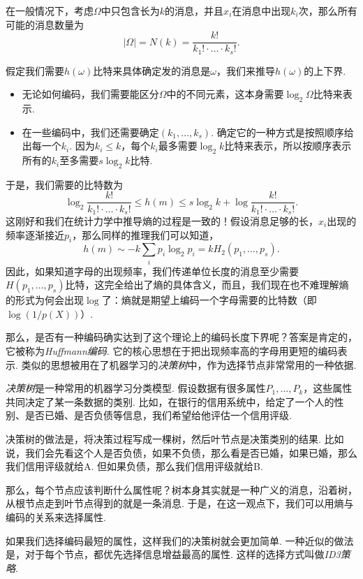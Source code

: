 在一般情况下，考虑$\Omega$中只包含长为$k$的消息，并且$x_i$在消息中出现$k_i$次，那么所有可能的消息数量为
\[|\Omega|=N(k)=\frac{k!}{k_1!\cdot\dots\cdot k_s!}.\]

假定我们需要$h(\omega)$比特来具体确定发的消息是$\omega$，我们来推导$h(\omega)$的上下界. 
\begin{itemize}
    \item 无论如何编码，我们需要能区分$\Omega$中的不同元素，这本身需要$\log_2\Omega$比特来表示. 
    \item 在一些编码中，我们还需要确定$(k_1,\dots,k_s)$. 确定它的一种方式是按照顺序给出每一个$k_i$. 因为$k_i\leq k$，每个$k_i$最多需要$\log_2 k$比特来表示，所以按顺序表示所有的$k_i$至多需要$s\log_2 k$比特.
\end{itemize}
于是，我们需要的比特数为
\[\log_2\frac{k!}{k_1!\cdot\dots\cdot k_s!}\leq h(m)\leq s\log_2k+\log\frac{k!}{k_1!\cdot\dots\cdot k_s!}.\]
这刚好和我们在统计力学中推导熵的过程是一致的！假设消息足够的长，$x_i$出现的频率逐渐接近$p_i$，那么同样的推理我们可以知道，
\[h(m)\sim -k\sum_i p_i\log_2 p_i=kH_2(p_1,\dots,p_s).\]
因此，如果知道字母的出现频率，我们传递单位长度的消息至少需要$H(p_1,\dots,p_s)$比特，这完全给出了熵的具体含义，而且，我们现在也不难理解熵的形式为何会出现$\log$了：熵就是期望上编码一个字母需要的比特数（即$\log(1/p(X))$）.

那么，是否有一种编码确实达到了这个理论上的编码长度下界呢？答案是肯定的，它被称为\textit{Huffmann编码}. 它的核心思想在于把出现频率高的字母用更短的编码表示. 类似的思想被用在了机器学习的\textit{决策树}中，作为选择节点非常常用的一种依据.
\begin{remark}
    \textit{决策树}是一种常用的机器学习分类模型. 假设数据有很多属性$P_1,\dots,P_k$，这些属性共同决定了某一条数据的类别. 比如，在银行的信用系统中，给定了一个人的性别、是否已婚、是否负债等信息，我们希望给他评估一个信用评级. 
    
    决策树的做法是，将决策过程写成一棵树，然后叶节点是决策类别的结果. 比如说，我们会先看这个人是否负债，如果不负债，那么看是否已婚，如果已婚，那么我们信用评级就给A. 但如果负债，那么我们信用评级就给B. 
    
    那么，每个节点应该判断什么属性呢？树本身其实就是一种广义的消息，沿着树，从根节点走到叶节点得到的就是一条消息. 于是，在这一观点下，我们可以用熵与编码的关系来选择属性. 

    如果我们选择编码最短的属性，这样我们的决策树就会更加简单. 一种近似的做法是，对于每个节点，都优先选择信息增益最高的属性. 这样的选择方式叫做\textit{ID3策略}.
\end{remark}

